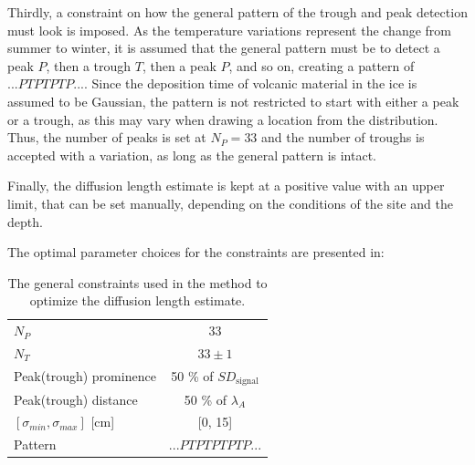 \documentclass[../../CompleteThesis2/Complete_2ndDraft]{subfiles}
\begin{document}
Thirdly, a constraint on how the general pattern of the trough and peak detection must look is imposed. As the temperature variations represent the change from summer to winter, it is assumed that the general pattern must be to detect a peak $P$, then a trough $T$, then a peak $P$, and so on, creating a pattern of $...PTPTPTP...$. Since the deposition time of volcanic material in the ice is assumed to be Gaussian, the pattern is not restricted to start with either a peak or a trough, as this may vary when drawing a location from the distribution. Thus, the number of peaks is set at $N_P=33$ and the number of troughs is accepted with a variation, as long as the general pattern is intact.

Finally, the diffusion length estimate is kept at a positive value with an upper limit, that can be set manually, depending on the conditions of the site and the depth. 

The optimal parameter choices for the constraints are presented in:
\begin{table}[ht]
	\centering
	\begin{tabular}{lc}
		\toprule 	
		$N_P$ & 33\\[0.15cm]
		$N_T$ & $33\pm 1$\\[0.15cm]
		Peak(trough) prominence & 50 \% of $SD_{\text{signal}}$\\[0.15cm]
		Peak(trough) distance & 50 \% of $\lambda_A$\\[0.15cm]
		$[\sigma_{min}, \sigma_{max}]$ [cm] & [0, 15]\\[0.15cm]
		Pattern & $...PTPTPTPTP...$\\
		\bottomrule
	\end{tabular}
	\caption[Constraint parameters]{The general constraints used in the method to optimize the diffusion length estimate.}
	\label{Tab:ConstraintParams}
\end{table}
\end{document}

